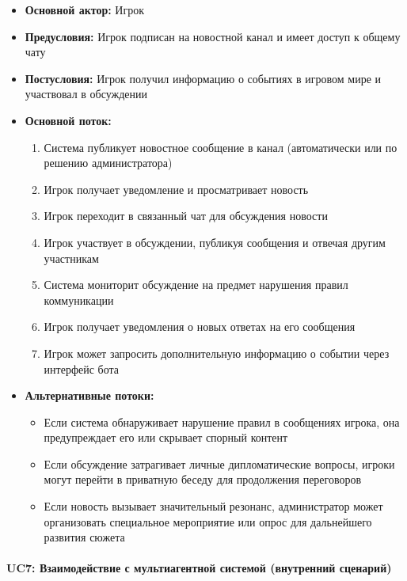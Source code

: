 \begin{itemize}
    \item \textbf{Основной актор:} Игрок
    \item \textbf{Предусловия:} Игрок подписан на новостной канал и имеет доступ к общему чату
    \item \textbf{Постусловия:} Игрок получил информацию о событиях в игровом мире и участвовал в обсуждении
    \item \textbf{Основной поток:}
    \begin{enumerate}
        \item Система публикует новостное сообщение в канал (автоматически или по решению администратора)
        \item Игрок получает уведомление и просматривает новость
        \item Игрок переходит в связанный чат для обсуждения новости
        \item Игрок участвует в обсуждении, публикуя сообщения и отвечая другим участникам
        \item Система мониторит обсуждение на предмет нарушения правил коммуникации
        \item Игрок получает уведомления о новых ответах на его сообщения
        \item Игрок может запросить дополнительную информацию о событии через интерфейс бота
    \end{enumerate}
    \item \textbf{Альтернативные потоки:}
    \begin{itemize}
        \item Если система обнаруживает нарушение правил в сообщениях игрока, она предупреждает его или скрывает спорный контент
        \item Если обсуждение затрагивает личные дипломатические вопросы, игроки могут перейти в приватную беседу для продолжения переговоров
        \item Если новость вызывает значительный резонанс, администратор может организовать специальное мероприятие или опрос для дальнейшего развития сюжета
    \end{itemize}
\end{itemize}

\paragraph{UC7: Взаимодействие с мультиагентной системой (внутренний сценарий)}

